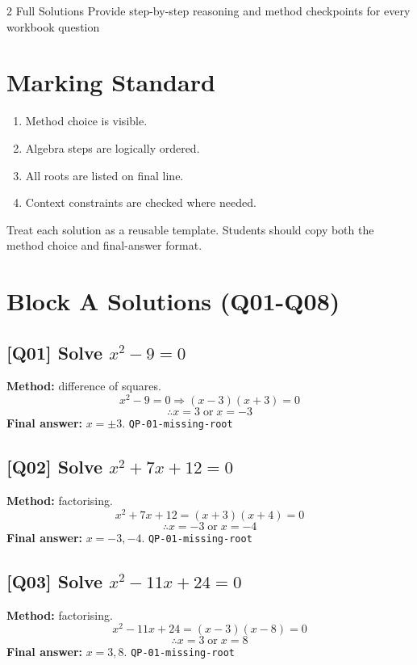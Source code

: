 \documentclass[11pt,a4paper]{article}
\newcommand{\QID}[1]{\textcolor{MPrimary}{\textbf{[#1]}}}
\newcommand{\Tag}[1]{\textcolor{MMuted}{\texttt{#1}}}
\begin{document}

\MasteryModuleCover
  {2}
  {Full Solutions}
  {Provide step-by-step reasoning and method checkpoints for every workbook question}

\section{Marking Standard}
\begin{enumerate}[leftmargin=1.3em]
  \item Method choice is visible.
  \item Algebra steps are logically ordered.
  \item All roots are listed on final line.
  \item Context constraints are checked where needed.
\end{enumerate}

\begin{keyconceptbox}
Treat each solution as a reusable template. Students should copy both the method choice and final-answer format.
\end{keyconceptbox}

\section{Block A Solutions (Q01-Q08)}

\subsection*{\QID{Q01} Solve \(x^2-9=0\)}
\textbf{Method:} difference of squares.
\[
x^2-9=0 \Rightarrow (x-3)(x+3)=0
\]
\[
\therefore x=3\;\text{or}\;x=-3
\]
\textbf{Final answer:} \(x=\pm3\). \Tag{QP-01-missing-root}

\subsection*{\QID{Q02} Solve \(x^2+7x+12=0\)}
\textbf{Method:} factorising.
\[
x^2+7x+12=(x+3)(x+4)=0
\]
\[
\therefore x=-3\;\text{or}\;x=-4
\]
\textbf{Final answer:} \(x=-3,-4\). \Tag{QP-01-missing-root}

\subsection*{\QID{Q03} Solve \(x^2-11x+24=0\)}
\textbf{Method:} factorising.
\[
x^2-11x+24=(x-3)(x-8)=0
\]
\[
\therefore x=3\;\text{or}\;x=8
\]
\textbf{Final answer:} \(x=3,8\). \Tag{QP-01-missing-root}
\end{document}
